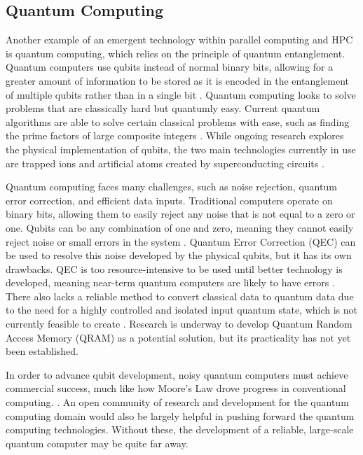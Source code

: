 \documentclass[twocolumn,12pt, singlespace]{IEEEtran}
\begin{document}
\subsection{Quantum Computing}
Another example of an emergent technology within parallel computing and HPC is quantum computing, which relies on the principle of quantum entanglement. Quantum computers use qubits instead of normal binary bits, allowing for a greater amount of information to be stored as it is encoded in the entanglement of multiple qubits rather than in a single bit \cite{Preskill:2018}. Quantum computing looks to solve problems that are classically hard but quantumly easy. Current quantum algorithms are able to solve certain classical problems with ease, such as finding the prime factors of large composite integers \cite{Preskill:2018}. While ongoing research explores the physical implementation of qubits, the two main technologies currently in use are trapped ions and artificial atoms created by superconducting circuits \cite{National:2019}.

Quantum computing faces many challenges, such as noise rejection, quantum error correction, and efficient data inputs. Traditional computers operate on binary bits, allowing them to easily reject any noise that is not equal to a zero or one. Qubits can be any combination of one and zero, meaning they cannot easily reject noise or small errors in the system \cite{National:2019}. Quantum Error Correction (QEC) can be used to resolve this noise developed by the physical qubits, but it has its own drawbacks. QEC is too resource-intensive to be used until better technology is developed, meaning near-term quantum computers are likely to have errors \cite{National:2019}. There also lacks a reliable method to convert classical data to quantum data due to the need for a highly controlled and isolated input quantum state, which is not currently feasible to create \cite{National:2019}. Research is underway to develop Quantum Random Access Memory (QRAM) as a potential solution, but its practicality has not yet been established.

In order to advance qubit development, noisy quantum computers must achieve commercial success, much like how Moore's Law drove progress in conventional computing. \cite{National:2019}. An open community of research and development for the quantum computing domain would also be largely helpful in pushing forward the quantum computing technologies. Without these, the development of a reliable, large-scale quantum computer may be quite far away.
\end{document}
